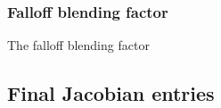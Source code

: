 \documentclass[12pt]{article}
\begin{document}
\subsubsection{Falloff blending factor}
\label{s:dfi}

The falloff blending factor 



\subsection{Final Jacobian entries}
\label{s:jac_final}

\printbibliography 
\end{document}
